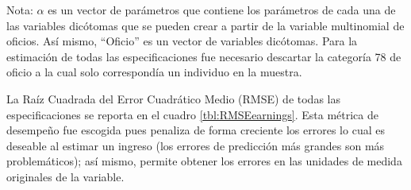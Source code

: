 \documentclass[11pt,a4paper]{article}
\begin{document}
\begin{table}[H]
  \centering
  \caption{Especificaciones para la predicción de \emph{earnings}}
  \label{tab:model_specification_pred}
  \begin{tablenotes}
    \centering \footnotesize Nota: $\alpha$ es un vector de parámetros que contiene los parámetros de cada una de las variables dicótomas que se pueden crear a partir de la variable multinomial de oficios. Así mismo, ``Oficio'' es un vector de variables dicótomas. Para la estimación de todas las especificaciones fue necesario descartar la categoría 78 de oficio a la cual solo correspondía un individuo en la muestra.
\end{tablenotes}
\label{tbl:earningsEspecif}
  \end{table}

La Raíz Cuadrada del Error Cuadrático Medio (RMSE) de todas las especificaciones se reporta en el cuadro \ref{tbl:RMSEearnings}. Esta métrica de desempeño fue escogida pues penaliza de forma creciente los errores lo cual es deseable al estimar un ingreso (los errores de predicción más grandes son más problemáticos); así mismo, permite obtener los errores en las unidades de medida originales de la variable.    
\end{document}
